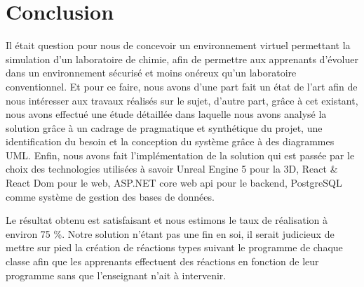 \chapter*{Conclusion}

Il était question pour nous de concevoir un environnement virtuel permettant la simulation d'un laboratoire de chimie, afin de permettre aux apprenants d'évoluer dans un environnement sécurisé et moins onéreux qu'un laboratoire conventionnel.
Et pour ce faire, nous avons d'une part fait un état de l'art afin de nous intéresser aux travaux réalisés sur le sujet, d'autre part, grâce à cet existant, nous avons effectué une étude détaillée dans laquelle nous avons analysé la solution grâce à un cadrage de pragmatique et synthétique du projet, une identification du besoin et la conception du système grâce à des diagrammes UML. 
Enfin, nous avons fait l'implémentation de la solution qui est passée par le choix des technologies utilisées à savoir Unreal Engine 5 pour la 3D, React \& React Dom pour le web, ASP.NET core web api pour le backend, PostgreSQL comme système de gestion des bases de données.

Le résultat obtenu est satisfaisant et nous estimons le taux de réalisation à environ 75 \%. 
Notre solution n'étant pas une fin en soi, il serait judicieux de mettre sur pied la création de réactions types suivant le programme de chaque classe afin que les apprenants effectuent des réactions en fonction de leur programme sans que l'enseignant n'ait à intervenir.
